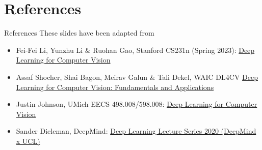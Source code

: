 \section{References}
\begin{frame}{References}
These slides have been adapted from
\begin{itemize}
    \item Fei-Fei Li, Yunzhu Li \& Ruohan Gao, Stanford CS231n (Spring 2023): \href{https://cs231n.stanford.edu/2023/}{Deep Learning for Computer Vision}
    \item Assaf Shocher, Shai Bagon, Meirav Galun \& Tali Dekel, WAIC DL4CV \href{https://dl4cv.github.io/index.html}{Deep Learning for Computer Vision: Fundamentals and Applications}
    \item Justin Johnson, UMich EECS 498.008/598.008: \href{https://web.eecs.umich.edu/~justincj/teaching/eecs498/WI2022/}{Deep Learning for Computer Vision}
    \item Sander Dieleman, DeepMind: \href{https://www.youtube.com/playlist?list=PLqYmG7hTraZCDxZ44o4p3N5Anz3lLRVZF}{Deep Learning Lecture Series 2020 (DeepMind x UCL)}
\end{itemize}
\end{frame}
